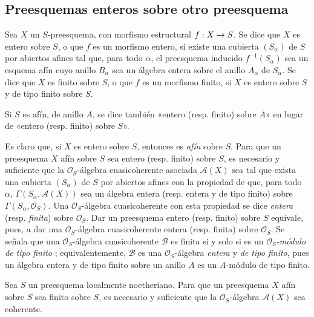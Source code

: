 \documentclass[oneside,10pt]{amsart}
\makeatletter
\newcommand{\ega@arrow}[2]{\mathchoice{#1}{#2}{#2}{#2}}
\renewcommand{\to}{\ega@arrow{\longrightarrow}{\rightarrow}}
\let\EGAOriginalLabel\label
\renewcommand{\label}[1]{\phantomsection\EGAOriginalLabel{#1}}
\makeatother
\begin{document}
\subsection{Preesquemas enteros sobre otro preesquema}
\label{subsection:II.6.1-fr}

\begin{definition}[6.1.1]
\label{II.6.1.1-fr}
Sea $X$ un $S$-preesquema, con morfismo estructural $f:X\to S$.
Se dice que $X$ es entero sobre $S$, o que $f$ es un morfismo entero, si existe una cubierta $(S_\alpha)$ de $S$ por abiertos afines tal que, para todo $\alpha$, el preesquema inducido $f^{-1}(S_\alpha)$ sea un esquema afín cuyo anillo $B_\alpha$ sea un álgebra entera sobre el anillo $A_\alpha$ de $S_\alpha$.
Se dice que $X$ es finito sobre $S$, o que $f$ es un morfismo finito, si $X$ es entero sobre $S$ y de tipo finito sobre $S$.
\end{definition}

Si $S$ es afín, de anillo $A$, se dice también «entero (resp. finito) sobre $A$» en lugar de «entero (resp. finito) sobre $S$».

\begin{env}[6.1.2]
\label{II.6.1.2-fr}
Es claro que, si $X$ es entero sobre $S$, entonces es \emph{afín} sobre $S$.
Para que un preesquema $X$ afín sobre $S$ sea entero (resp. finito) sobre $S$, es necesario y suficiente que la $\mathcal{O}_S$-álgebra cuasicoherente asociada $\mathcal{A}(X)$ sea tal que exista una cubierta $(S_\alpha)$ de $S$ por abiertos afines con la propiedad de que, para todo $\alpha$, $\Gamma(S_\alpha,\mathcal{A}(X))$ sea un álgebra entera (resp. entera y de tipo finito) sobre $\Gamma(S_\alpha,\mathcal{O}_S)$.
Una $\mathcal{O}_S$-álgebra cuasicoherente con esta propiedad se dice \emph{entera} (resp. \emph{finita}) sobre $\mathcal{O}_S$.
Dar un preesquema entero (resp. finito) sobre $S$ equivale, pues,  a dar una $\mathcal{O}_S$-álgebra cuasicoherente entera (resp. finita) sobre $\mathcal{O}_S$.
Se señala que una $\mathcal{O}_S$-álgebra cuasicoherente $\mathcal{B}$ es finita si y solo si es un \emph{$\mathcal{O}_S$-módulo de tipo finito} ;
equivalentemente, $\mathcal{B}$ es una $\mathcal{O}_S$-álgebra \emph{entera} y \emph{de tipo finito}, pues un álgebra entera y de tipo finito sobre un anillo $A$ es un $A$-módulo de tipo finito.
\end{env}

\begin{proposition}[6.1.3]
\label{II.6.1.3-fr}
Sea $S$ un preesquema localmente noetheriano.
Para que un preesquema $X$ afín sobre $S$ sea finito sobre $S$, es necesario y suficiente que la $\mathcal{O}_S$-álgebra $\mathcal{A}(X)$ sea coherente.
\end{proposition}
\end{document}
